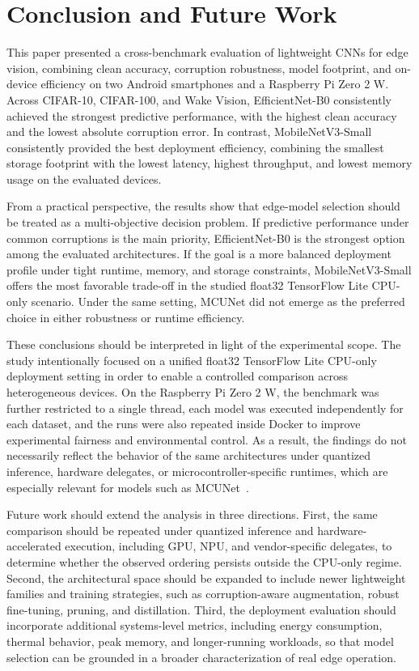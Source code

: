 \documentclass[runningheads]{llncs}
\begin{document}
\section{Conclusion and Future Work}
\label{sec:conclusion}

This paper presented a cross-benchmark evaluation of lightweight CNNs for edge vision, combining clean accuracy, corruption robustness, model footprint, and on-device efficiency on two Android smartphones and a Raspberry Pi Zero 2 W. Across CIFAR-10, CIFAR-100, and Wake Vision, EfficientNet-B0 consistently achieved the strongest predictive performance, with the highest clean accuracy and the lowest absolute corruption error. In contrast, MobileNetV3-Small consistently provided the best deployment efficiency, combining the smallest storage footprint with the lowest latency, highest throughput, and lowest memory usage on the evaluated devices.

From a practical perspective, the results show that edge-model selection should be treated as a multi-objective decision problem. If predictive performance under common corruptions is the main priority, EfficientNet-B0 is the strongest option among the evaluated architectures. If the goal is a more balanced deployment profile under tight runtime, memory, and storage constraints, MobileNetV3-Small offers the most favorable trade-off in the studied float32 TensorFlow Lite CPU-only scenario. Under the same setting, MCUNet did not emerge as the preferred choice in either robustness or runtime efficiency.

These conclusions should be interpreted in light of the experimental scope. The study intentionally focused on a unified float32 TensorFlow Lite CPU-only deployment setting in order to enable a controlled comparison across heterogeneous devices. On the Raspberry Pi Zero 2 W, the benchmark was further restricted to a single thread, each model was executed independently for each dataset, and the runs were also repeated inside Docker to improve experimental fairness and environmental control. As a result, the findings do not necessarily reflect the behavior of the same architectures under quantized inference, hardware delegates, or microcontroller-specific runtimes, which are especially relevant for models such as MCUNet~\cite{lin2020mcunet}.

Future work should extend the analysis in three directions. First, the same comparison should be repeated under quantized inference and hardware-accelerated execution, including GPU, NPU, and vendor-specific delegates, to determine whether the observed ordering persists outside the CPU-only regime. Second, the architectural space should be expanded to include newer lightweight families and training strategies, such as corruption-aware augmentation, robust fine-tuning, pruning, and distillation. Third, the deployment evaluation should incorporate additional systems-level metrics, including energy consumption, thermal behavior, peak memory, and longer-running workloads, so that model selection can be grounded in a broader characterization of real edge operation.



\end{document}
